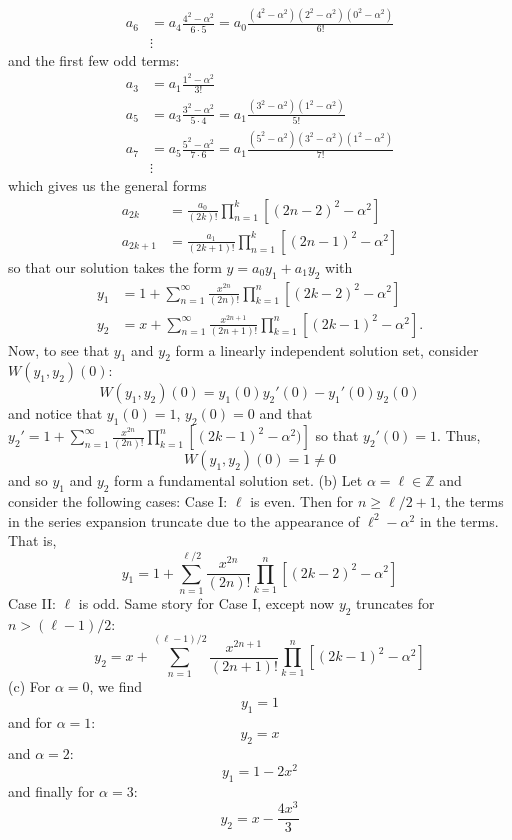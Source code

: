 \documentclass{article}
\begin{document}
\begin{itemize}
\begin{align*}
        a_6 &= a_4\frac{4^2 - \alpha^2}{6\cdot5} = a_0\frac{(4^2 - \alpha^2)(2^2 - \alpha^2)(0^2 - \alpha^2)}{6!}\\
            &\vdots
    \end{align*}
    and the first few odd terms:
    \begin{align*}
        a_3 &= a_1\frac{1^2 - \alpha^2}{3!}\\
        a_5 &= a_3\frac{3^2 - \alpha^2}{5\cdot4} = a_1\frac{(3^2 - \alpha^2)(1^2 - \alpha^2)}{5!}\\
        a_7 &= a_5\frac{5^2 - \alpha^2}{7\cdot6} = a_1\frac{(5^2 - \alpha^2)(3^2 - \alpha^2)(1^2 - \alpha^2)}{7!}\\
            &\vdots
    \end{align*}
    which gives us the general forms
    \begin{align*}
        a_{2k} &= \frac{a_0}{(2k)!}\prod_{n = 1}^k[(2n-2)^2 - \alpha^2]\\
        a_{2k + 1} &= \frac{a_1}{(2k+1)!}\prod_{n = 1}^k [(2n - 1)^2 - \alpha^2]
    \end{align*}
    so that our solution takes the form $y = a_0y_1 + a_1y_2$ with
    \begin{align*}
        y_1 &= 1 + \sum_{n = 1}^{\infty} \frac{x^{2n}}{(2n)!}\prod_{k = 1}^n[(2k - 2)^2 - \alpha^2]\\
        y_2 &= x + \sum_{n = 1}^{\infty} \frac{x^{2n + 1}}{(2n + 1)!}\prod_{k = 1}^n [(2k - 1)^2 - \alpha^2].
    \end{align*}
    Now, to see that $y_1$ and $y_2$ form a linearly independent solution set, consider $W(y_1,y_2)(0)$:
    \[W(y_1,y_2)(0) = y_1(0)y_2'(0) - y_1'(0)y_2(0)\]
    and notice that $y_1(0) = 1$, $y_2(0) = 0$ and that $y_2' = 1 + \sum_{n = 1}^{\infty} \frac{x^{2n}}{(2n)!}\prod_{k = 1}^n[(2k - 1)^2 - \alpha^2)]$ so that $y_2'(0) = 1$. Thus,
    \[W(y_1,y_2)(0) = 1 \neq 0\]
    and so $y_1$ and $y_2$ form a fundamental solution set.
    \newline\newline
    (b) Let $\alpha = \ell \in \mathbb{Z}$ and consider the following cases:
    \newline
    Case I: $\ell$ is even. Then for $n \geq \ell/2 + 1$, the terms in the series expansion truncate due to the appearance of $\ell^2 - \alpha^2$ in the terms. That is, 
    \[y_1 = 1 + \sum_{n = 1}^{\ell/2}\frac{x^{2n}}{(2n)!}\prod_{k = 1}^n[(2k - 2)^2 - \alpha^2]\]
    Case II: $\ell$ is odd. Same story for Case I, except now $y_2$ truncates for $n > (\ell-1)/2$:
    \[y_2 = x + \sum_{n = 1}^{(\ell - 1)/2}\frac{x^{2n+1}}{(2n + 1)!}\prod_{k = 1}^n [(2k - 1)^2 - \alpha^2]\]
    (c) For $\alpha = 0$, we find
    \[y_1 = 1\]
    and for $\alpha = 1$:
    \[y_2 = x\]
    and $\alpha = 2$:
    \[y_1 = 1 - 2x^2\]
    and finally for $\alpha = 3$:
    \[y_2 = x - \frac{4x^3}{3}\]
    

\end{itemize}
\end{document}

